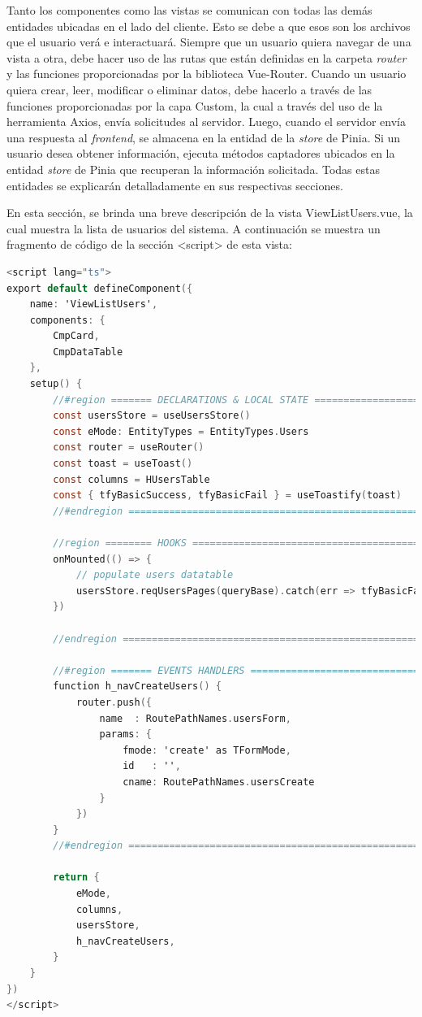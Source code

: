 
Tanto los componentes como las vistas se comunican con todas las demás entidades ubicadas en el lado del cliente. Esto se debe a que esos son los archivos que el usuario verá e interactuará. Siempre que un usuario quiera navegar de una vista a otra, debe hacer uso de las rutas que están definidas en la carpeta \textit{router} y las funciones proporcionadas por la biblioteca Vue-Router. Cuando un usuario quiera crear, leer, modificar o eliminar datos, debe hacerlo a través de las funciones proporcionadas por la capa Custom, la cual a través del uso de la herramienta Axios, envía solicitudes al servidor. Luego, cuando el servidor envía una respuesta al \textit{frontend}, se almacena en la entidad de la \textit{store} de Pinia. Si un usuario desea obtener información, ejecuta métodos captadores ubicados en la entidad \textit{store} de Pinia que recuperan la información solicitada. Todas estas entidades se explicarán detalladamente en sus respectivas secciones.

En esta sección, se brinda una breve descripción de la vista ViewListUsers.vue, la cual muestra la lista de usuarios del sistema. A continuación se muestra un fragmento de código de la sección <script> de esta vista:

\begin{lstlisting}[language=C,caption={Sección <script> de VueListUsers.vue}, label={lst:viewlist}]
<script lang="ts">
export default defineComponent({
    name: 'ViewListUsers',
    components: {
        CmpCard,
        CmpDataTable
    },
    setup() {
        //#region ======= DECLARATIONS & LOCAL STATE ==========================================
        const usersStore = useUsersStore()
        const eMode: EntityTypes = EntityTypes.Users
        const router = useRouter()
        const toast = useToast()
        const columns = HUsersTable
        const { tfyBasicSuccess, tfyBasicFail } = useToastify(toast)
        //#endregion ===========================================================

        //region ======== HOOKS ================================================
        onMounted(() => {
            // populate users datatable
            usersStore.reqUsersPages(queryBase).catch(err => tfyBasicFail(err, 'Users', 'request'))
        })

        //endregion ============================================================
        
        //#region ======= EVENTS HANDLERS ======================================
        function h_navCreateUsers() {
            router.push({
                name  : RoutePathNames.usersForm,
                params: {
                    fmode: 'create' as TFormMode,
                    id   : '',
                    cname: RoutePathNames.usersCreate 
                }
            })
        }
        //#endregion =========================================================

        return {
            eMode,
            columns,
            usersStore,
            h_navCreateUsers,
        }
    }
})
</script>
\end{lstlisting}

